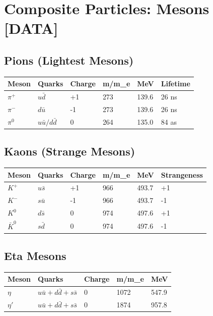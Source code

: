 \documentclass[
  11pt,
  letterpaper,
  twoside,
  openright]{book}
\begin{document}
\section{Composite Particles: Mesons
{[}DATA{]}}\label{composite-particles-mesons-data}

\subsection{Pions (Lightest Mesons)}\label{pions-lightest-mesons}

\begin{longtable}[]{@{}llllll@{}}
\toprule\noalign{}
Meson & Quarks & Charge & m/m\_e & MeV & Lifetime \\
\midrule\noalign{}
\endhead
\bottomrule\noalign{}
\endlastfoot
\(\pi^+\) & \(u\bar{d}\) & +1 & 273 & 139.6 & 26 ns \\
\(\pi^-\) & \(d\bar{u}\) & -1 & 273 & 139.6 & 26 ns \\
\(\pi^0\) & \(u\bar{u}/d\bar{d}\) & 0 & 264 & 135.0 & 84 as \\
\end{longtable}

\subsection{Kaons (Strange Mesons)}\label{kaons-strange-mesons}

\begin{longtable}[]{@{}llllll@{}}
\toprule\noalign{}
Meson & Quarks & Charge & m/m\_e & MeV & Strangeness \\
\midrule\noalign{}
\endhead
\bottomrule\noalign{}
\endlastfoot
\(K^+\) & \(u\bar{s}\) & +1 & 966 & 493.7 & +1 \\
\(K^-\) & \(s\bar{u}\) & -1 & 966 & 493.7 & -1 \\
\(K^0\) & \(d\bar{s}\) & 0 & 974 & 497.6 & +1 \\
\(\bar{K}^0\) & \(s\bar{d}\) & 0 & 974 & 497.6 & -1 \\
\end{longtable}

\subsection{Eta Mesons}\label{eta-mesons}

\begin{longtable}[]{@{}lllll@{}}
\toprule\noalign{}
Meson & Quarks & Charge & m/m\_e & MeV \\
\midrule\noalign{}
\endhead
\bottomrule\noalign{}
\endlastfoot
\(\eta\) & \(u\bar{u}+d\bar{d}+s\bar{s}\) & 0 & 1072 & 547.9 \\
\(\eta'\) & \(u\bar{u}+d\bar{d}+s\bar{s}\) & 0 & 1874 & 957.8 \\
\end{longtable}
\end{document}
